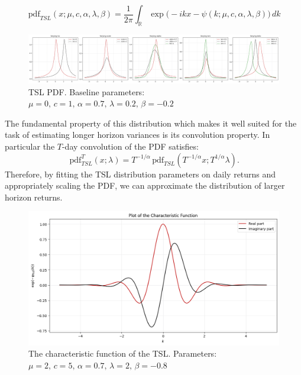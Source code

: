 \documentclass[11pt]{article}
\newcommand{\pdf}{\,\mathrm{pdf}}
\begin{document}
        \begin{equation}
            \pdf_{TSL}(x; \mu, c, \alpha, \lambda, \beta) =  \frac{1}{2\pi}\int_{\mathbb R} \exp\big(-ikx-\psi(k; \mu, c, \alpha, \lambda, \beta)\big)\,dk\label{eq:pdf}
        \end{equation}
        \begin{figure}[h!]
            \label{fig:parameters}
            \centering
            \includegraphics[width=0.9 \linewidth]{img/parameters}
            \caption{TSL PDF. Baseline parameters: $\mu=0, \,c=1,\, \alpha = 0.7, \, \lambda = 0.2,\, \beta =-0.2$}
        \end{figure}
        The fundamental property of this distribution which makes it well suited for the task of estimating longer horizon variances is its convolution property.
        In particular the $T$-day convolution of the PDF satisfies:
        \begin{equation}
            \pdf^T_{TSL}(x; \lambda) = T^{-1/\alpha} \pdf_{TSL}\left(T^{-1/\alpha} x; T^{1/\alpha}\lambda\right).
            \label{eq:scaling}
        \end{equation}
        Therefore, by fitting the TSL distribution parameters on daily returns and appropriately scaling the PDF, we can approximate the distribution of larger horizon returns.

        \begin{figure}[h!]
            \centering
            \includegraphics[width=0.6 \linewidth]{img/char_func}
            \caption{The characteristic function of the TSL. Parameters: $\mu=2, \,c=5,\, \alpha = 0.7, \, \lambda = 2,\, \beta =-0.8$}
            \label{fig:char_func}
        \end{figure}
\end{document}
